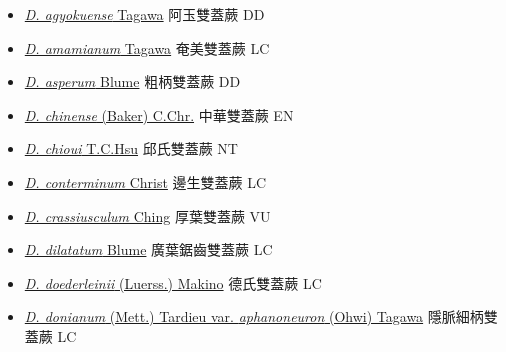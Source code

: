 \begin{itemize}
  \begin{itemize}
        \item[] \href{http://www.theplantlist.org/tpl1.1/search?q=Diplazium+agyokuense}{\textit{D. agyokuense} Tagawa}   阿玉雙蓋蕨 DD
        \item[] \href{http://www.theplantlist.org/tpl1.1/search?q=Diplazium+amamianum}{\textit{D. amamianum} Tagawa}   奄美雙蓋蕨 LC
        \item[] \href{http://www.theplantlist.org/tpl1.1/search?q=Diplazium+asperum}{\textit{D. asperum} Blume}   粗柄雙蓋蕨 DD
        \item[] \href{http://www.theplantlist.org/tpl1.1/search?q=Diplazium+chinense}{\textit{D. chinense} (Baker) C.Chr.}   中華雙蓋蕨 EN
        \item[] \href{http://www.theplantlist.org/tpl1.1/search?q=Diplazium+chioui}{\textit{D. chioui} T.C.Hsu}   邱氏雙蓋蕨 NT
        \item[] \href{http://www.theplantlist.org/tpl1.1/search?q=Diplazium+conterminum}{\textit{D. conterminum} Christ}   邊生雙蓋蕨 LC
        \item[] \href{http://www.theplantlist.org/tpl1.1/search?q=Diplazium+crassiusculum}{\textit{D. crassiusculum} Ching}   厚葉雙蓋蕨 VU
        \item[] \href{http://www.theplantlist.org/tpl1.1/search?q=Diplazium+dilatatum}{\textit{D. dilatatum} Blume}   廣葉鋸齒雙蓋蕨 LC
        \item[] \href{http://www.theplantlist.org/tpl1.1/search?q=Diplazium+doederleinii}{\textit{D. doederleinii} (Luerss.) Makino}   德氏雙蓋蕨 LC
        \item[] \href{http://www.theplantlist.org/tpl1.1/search?q=Diplazium+donianum+var.+aphanoneuron}{\textit{D. donianum} (Mett.) Tardieu var. \textit{aphanoneuron} (Ohwi) Tagawa}   隱脈細柄雙蓋蕨 LC

\end{itemize}
\end{itemize}

